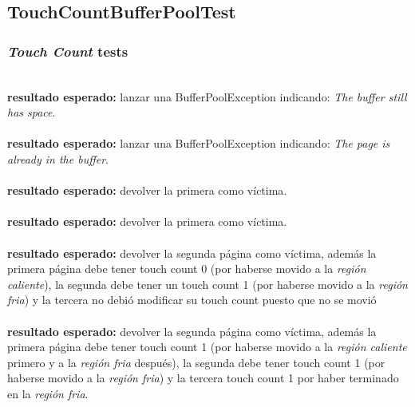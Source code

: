 \documentclass[11pt, a4paper, spanish]{article}
\begin{document}
\subsection{TouchCountBufferPoolTest}

\subsubsection{\textit{Touch Count} tests}

\\
\textbf{resultado esperado:} lanzar una BufferPoolException indicando: \textit{The buffer still has space}. \\

\\
\textbf{resultado esperado:} lanzar una BufferPoolException indicando: \textit{The page is already in the buffer}. \\

\\
\textbf{resultado esperado:} devolver la primera como v\'ictima.\\

\\
\textbf{resultado esperado:} devolver la primera como v\'ictima.\\

\\
\textbf{resultado esperado:} devolver la segunda p\'agina como v\'ictima, adem\'as la primera p\'agina debe tener touch count 0 (por haberse movido
a la \textit{regi\'on caliente}), la segunda debe tener un touch count 1 (por haberse movido a la \textit{regi\'on fria}) y la tercera no debi\'o
modificar su touch count puesto que no se movi\'o\\

\\
\textbf{resultado esperado:} devolver la segunda p\'agina como v\'ictima, adem\'as la primera p\'agina debe tener touch count 1 (por haberse movido
a la \textit{regi\'on caliente} primero y a la \textit{regi\'on fria} despu\'es), la segunda debe tener touch count 1 (por haberse movido a la 
\textit{regi\'on fria}) y la tercera touch count 1 por haber terminado en la  \textit{regi\'on fria}.\\
\end{document}

